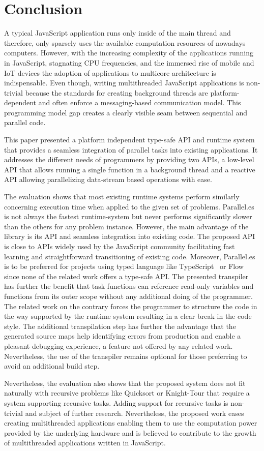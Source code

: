 \section{Conclusion}\label{sec:conclusion}
A typical JavaScript application runs only inside of the main thread and therefore, only sparsely uses the available computation resources of nowadays computers. However, with the increasing complexity of the applications running in JavaScript, stagnating CPU frequencies, and the immersed rise of mobile and IoT devices the adoption of applications to multicore architecture is indispensable. Even though, writing multithreaded JavaScript applications is non-trivial because the standards for creating background threads are platform-dependent and often enforce a messaging-based communication model. This programming model gap creates a clearly visible seam between sequential and parallel code.

This paper presented a platform independent type-safe API and runtime system that provides a seamless integration of parallel tasks into existing applications. It addresses the different needs of programmers by providing two APIs, a low-level API that allows running a single function in a background thread and a reactive API allowing parallelizing data-stream based operations with ease. 

The evaluation shows that most existing runtime systems perform similarly concerning execution time when applied to the given set of problems. Parallel.es is not always the fastest runtime-system but never performs significantly slower than the others for any problem instance. However, the main advantage of the library is its API and seamless integration into existing code. The proposed API is close to APIs widely used by the JavaScript community facilitating fast learning and straightforward transitioning of existing code. Moreover, Parallel.es is to be preferred for projects using typed language like TypeScript~\cite{typescript} or Flow~\cite{flow} since none of the related work offers a type-safe API. The presented transpiler has further the benefit that task functions can reference read-only variables and functions from its outer scope without any additional doing of the programmer. The related work on the contrary forces the programmer to structure the code in the way supported by the runtime system resulting in a clear break in the code style. The additional transpilation step has further the advantage that the generated source maps help identifying errors from production and enable a pleasant debugging experience, a feature not offered by any related work. Nevertheless, the use of the transpiler remains optional for those preferring to avoid an additional build step.

Nevertheless, the evaluation also shows that the proposed system does not fit naturally with recursive problems like Quicksort or Knight-Tour that require a system supporting recursive tasks. Adding support for recursive tasks is non-trivial and subject of further research. Nevertheless, the proposed work eases creating multithreaded applications enabling them to use the computation power provided by the underlying hardware and is believed to contribute to the growth of multithreaded applications written in JavaScript. 